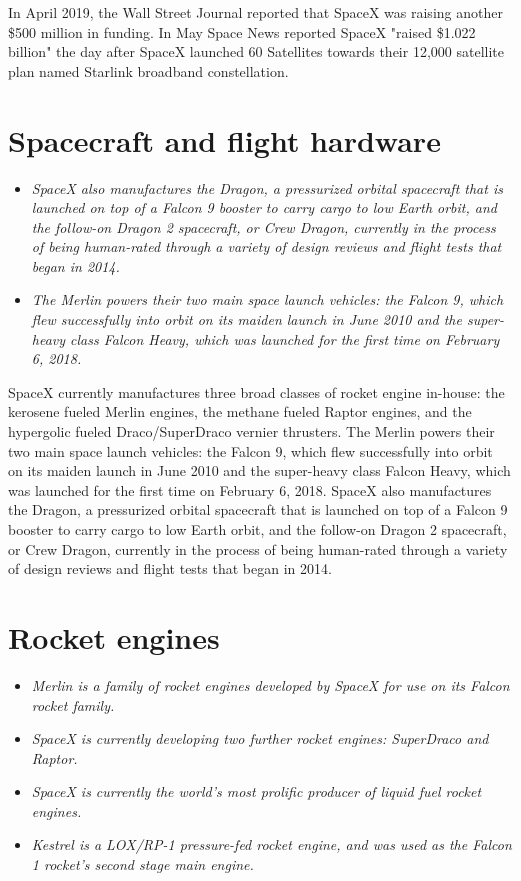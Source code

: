 In April 2019, the Wall Street Journal reported that SpaceX was raising
another \$500 million in funding. In May Space News reported SpaceX
"raised \$1.022 billion" the day after SpaceX launched 60 Satellites
towards their 12,000 satellite plan named Starlink broadband
constellation.

\section{Spacecraft and flight
hardware}\label{spacecraft-and-flight-hardware}

\begin{itemize}
\item
  \emph{SpaceX also manufactures the Dragon, a pressurized orbital
  spacecraft that is launched on top of a Falcon 9 booster to carry
  cargo to low Earth orbit, and the follow-on Dragon 2 spacecraft, or
  Crew Dragon, currently in the process of being human-rated through a
  variety of design reviews and flight tests that began in 2014.}
\item
  \emph{The Merlin powers their two main space launch vehicles: the
  Falcon 9, which flew successfully into orbit on its maiden launch in
  June 2010 and the super-heavy class Falcon Heavy, which was launched
  for the first time on February 6, 2018.}
\end{itemize}

SpaceX currently manufactures three broad classes of rocket engine
in-house: the kerosene fueled Merlin engines, the methane fueled Raptor
engines, and the hypergolic fueled Draco/SuperDraco vernier thrusters.
The Merlin powers their two main space launch vehicles: the Falcon 9,
which flew successfully into orbit on its maiden launch in June 2010 and
the super-heavy class Falcon Heavy, which was launched for the first
time on February 6, 2018. SpaceX also manufactures the Dragon, a
pressurized orbital spacecraft that is launched on top of a Falcon 9
booster to carry cargo to low Earth orbit, and the follow-on Dragon 2
spacecraft, or Crew Dragon, currently in the process of being
human-rated through a variety of design reviews and flight tests that
began in 2014.

\section{Rocket engines}\label{rocket-engines}

\begin{itemize}
\item
  \emph{Merlin is a family of rocket engines developed by SpaceX for use
  on its Falcon rocket family.}
\item
  \emph{SpaceX is currently developing two further rocket engines:
  SuperDraco and Raptor.}
\item
  \emph{SpaceX is currently the world's most prolific producer of liquid
  fuel rocket engines.}
\item
  \emph{Kestrel is a LOX/RP-1 pressure-fed rocket engine, and was used
  as the Falcon 1 rocket's second stage main engine.}
\end{itemize}

